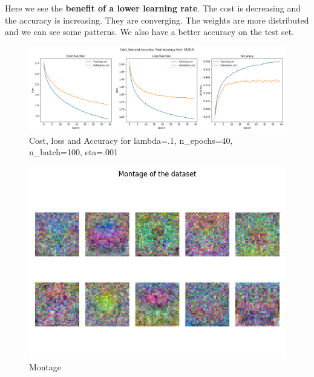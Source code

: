 \documentclass{article}
\begin{document}
Here we see the \textbf{benefit of a lower learning rate}. The cost is decreasing and the accuracy is increasing. They are converging. The weights are more distributed and we can see some patterns. We also have a better accuracy on the test set.
\begin{figure}[H]
    \centering
    \includegraphics[width=\linewidth]{Result_Pics/cost_loss_accuracy_0.1_40_100_0.001.png}
    \caption{Cost, loss and Accuracy for lambda=.1, n\_epochs=40, n\_batch=100, eta=.001}
\end{figure}
\begin{figure}[H]
    \centering
    \includegraphics[scale=0.6]{Result_Pics/weights_0.1_40_100_0.001.png}
    \caption{Montage}
\end{figure}
\end{document}
